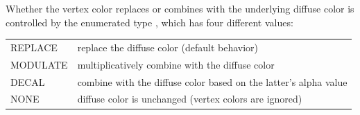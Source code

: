 Whether the vertex color replaces or combines with the underlying
diffuse color is controlled by the enumerated type
, which has four
different values:
%
\begin{center}
\begin{tabular}{|ll|}
\hline 
REPLACE & replace the diffuse color (default behavior) \\
MODULATE & multiplicatively combine with the diffuse color\\
DECAL & combine with the diffuse color based on the latter's alpha value \\
NONE & diffuse color is unchanged (vertex colors are ignored)\\
\hline
\end{tabular}
\end{center}
%

